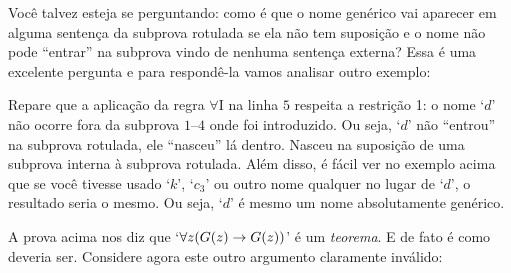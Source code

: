 
Você talvez esteja se perguntando: como é que o nome genérico vai aparecer em alguma sentença da subprova rotulada se ela não tem suposição e o nome não pode ``entrar'' na subprova vindo de nenhuma sentença externa?
Essa é uma excelente pergunta e para respondê-la vamos analisar outro exemplo:

\begin{fitchproof}
	\open
		\open
	     \close {}
	\close	{}
\end{fitchproof}
Repare que a aplicação da regra $\forall$I na linha $5$ respeita a restrição 1:
o nome `$d$' não ocorre fora da subprova $1$--$4$ onde foi introduzido.
Ou seja, `$d$' não ``entrou'' na subprova rotulada, ele ``nasceu'' lá dentro.
Nasceu na suposição de uma subprova interna à subprova rotulada. 
Além disso, é fácil ver no exemplo acima que se você tivesse usado `$k$', `$c_3$' ou outro nome qualquer no lugar de `$d$', o resultado seria o mesmo.
Ou seja, `$d$' é mesmo um nome absolutamente genérico.

A prova acima nos diz que `$\forall z (\mathord{G}(z) \rightarrow \mathord{G}(z))$' é um \emph{teorema}. E de fato é como deveria ser.
Considere agora este outro argumento claramente inválido:

